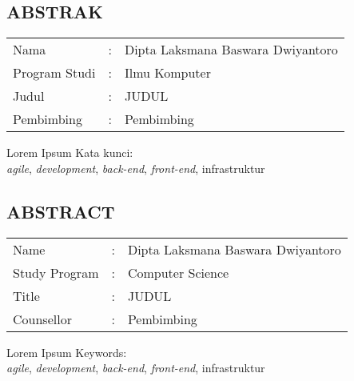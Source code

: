 \newpage
\begin{center}
    \section*{\centering ABSTRAK}
\end{center}
{
    \begin{tabular}{@{}l c p{}}
        Nama &: & Dipta Laksmana Baswara Dwiyantoro \\[-0.25cm]
        Program Studi &: & Ilmu Komputer \\[-0.25cm]
        Judul &:  & JUDUL\\[-0.25cm]
        Pembimbing &: & Pembimbing
    \end{tabular}
    \bigskip
    \noindentpar
    Lorem Ipsum
    \bigskip
    \noindentpar
    Kata kunci:\\
    \textit{agile}, \textit{development},  \textit{back-end}, \textit{front-end}, infrastruktur
}

\newpage
\begin{center}
    \section*{\centering ABSTRACT}
\end{center}
{
    \begin{tabular}{@{}l c p{}}
        Name &: & Dipta Laksmana Baswara Dwiyantoro \\[-0.25cm]
        Study Program &: & Computer Science \\[-0.25cm]
        Title &:  & JUDUL\\[-0.25cm]
        Counsellor &: & Pembimbing
    \end{tabular}
    \bigskip
    \noindentpar
    Lorem Ipsum
    \bigskip
    \noindentpar
    Keywords:\\
    \textit{agile}, \textit{development},  \textit{back-end}, \textit{front-end}, infrastruktur
}